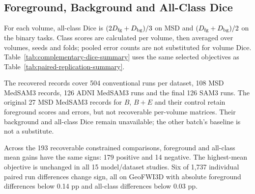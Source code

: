 \documentclass[12pt,a4paper]{article}
\begin{document}
\subsection{Foreground, Background and All-Class Dice}
\label{sec:metric-sensitivity-details}
For each volume, all-class Dice is $(2D_{\rm fg}+D_{\rm bg})/3$ on
MSD and $(D_{\rm fg}+D_{\rm bg})/2$ on the binary tasks. Class scores
are calculated per volume, then averaged over volumes, seeds and folds;
pooled error counts are not substituted for volume Dice.
Table~\ref{tab:complementary-dice-summary} uses the same selected
objectives as Table~\ref{tab:paired-replication-summary}.

The recovered records cover 504 conventional runs per dataset, 108 MSD
MedSAM3 records, 126 ADNI MedSAM3 runs and the final 126 SAM3 runs.
The original 27 MSD MedSAM3 records for $B$, $B+E$ and their control
retain foreground scores and errors, but not recoverable per-volume
matrices. Their background and all-class Dice remain unavailable;
the other batch's baseline is not a substitute.

Across the 193 recoverable constrained comparisons, foreground and
all-class mean gains have the same signs: 179 positive and 14 negative.
The highest-mean objective is unchanged in all 15 model/dataset studies.
Six of 1,737 individual paired run differences change sign, all on
GeoFWI3D with absolute foreground differences below 0.14 pp and
all-class differences below 0.03 pp.
\end{document}
